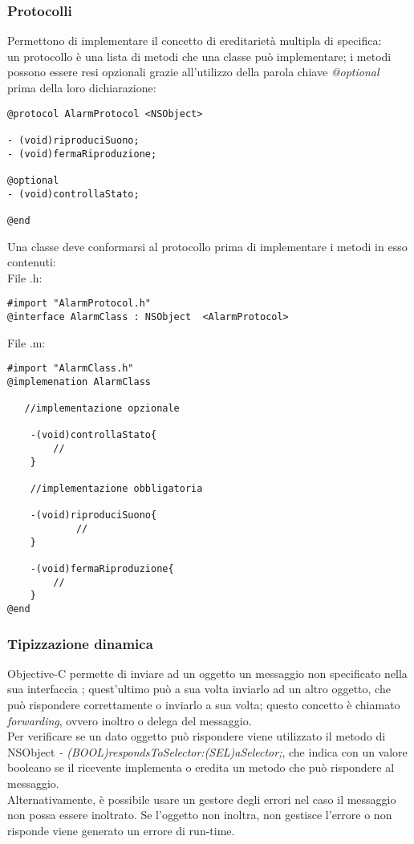 \subsubsection{Protocolli}
Permettono di implementare il concetto di ereditarietà multipla di specifica:\\
un protocollo è una lista di metodi che una classe può implementare; i metodi possono essere resi opzionali grazie all'utilizzo della parola chiave \textit{@optional} prima della loro dichiarazione: 
\lstset{language=[Objective]C, breakindent=40pt, breaklines}
\begin{lstlisting}
@protocol AlarmProtocol <NSObject>

- (void)riproduciSuono;
- (void)fermaRiproduzione;

@optional
- (void)controllaStato;

@end
\end{lstlisting}
\newpage
Una classe deve conformarsi al protocollo prima di implementare i metodi in esso contenuti:\\
File .h: 
\lstset{language=[Objective]C, breakindent=40pt, breaklines}
\begin{lstlisting}
#import "AlarmProtocol.h"
@interface AlarmClass : NSObject  <AlarmProtocol>
\end{lstlisting}
File .m:
\lstset{language=[Objective]C, breakindent=40pt, breaklines}
\begin{lstlisting}
#import "AlarmClass.h"
@implemenation AlarmClass
  
   //implementazione opzionale 
    
    -(void)controllaStato{
		//
    }

    //implementazione obbligatoria  
   
    -(void)riproduciSuono{
    	    // 
    }
    
    -(void)fermaRiproduzione{
   	 	//
    }
@end
\end{lstlisting}
\subsubsection{Tipizzazione dinamica}
Objective-C permette di inviare ad un oggetto un messaggio non specificato nella sua interfaccia ; quest'ultimo può a sua volta inviarlo ad un altro oggetto, che può rispondere correttamente o inviarlo a sua volta; questo concetto è chiamato \textit{forwarding}, ovvero inoltro o delega del messaggio.\\Per verificare se un dato oggetto può rispondere viene utilizzato il metodo di NSObject \textit{- (BOOL)respondsToSelector:(SEL)aSelector;}, che indica con un valore booleano se il ricevente implementa o eredita un metodo che può rispondere al messaggio.\\Alternativamente, è possibile usare un gestore degli errori nel caso il messaggio non possa essere inoltrato. Se l'oggetto non inoltra, non gestisce l'errore o non risponde viene generato un errore di run-time. 
